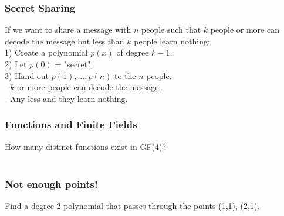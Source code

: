 \documentclass[9pt]{beamer}
\begin{document}
\begin{frame}[fragile]
  \frametitle{Secret Sharing} 
{\small
If we want to share a message with $n$ people such that $k$ people or more can decode the message but less than $k$ people learn nothing: \\
1) Create a polynomial $p(x)$ of degree $k-1$. \\
2) Let $p(0)$ = "secret". \\
3) Hand out $p(1),...,p(n)$ to the $n$ people. \\ \vspace{3.0mm}
- $k$ or more people can decode the message. \\
- Any less and they learn nothing. \\
}
\end{frame}

\begin{frame}[fragile]
  \frametitle{Functions and Finite Fields} 
{\small
How many distinct functions exist in GF(4)?\\ \vspace{5.0mm}
 \\ \vspace{5.0mm}
}
\end{frame}

\begin{frame}[fragile]
  \frametitle{Not enough points!} 
{\small
Find a degree 2 polynomial that passes through the points (1,1), (2,1).\\ \vspace{5.0mm}
}
\end{frame}
\end{document}
